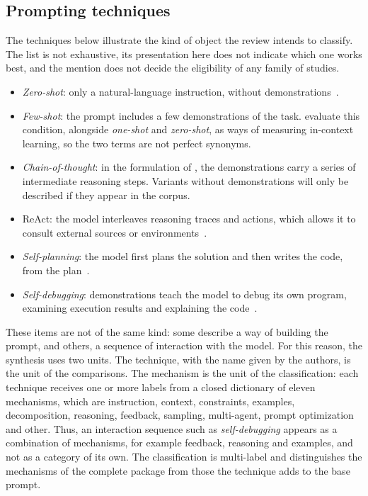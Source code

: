 \subsection{Prompting techniques}
The techniques below illustrate the kind of object the review intends to classify. The list is not
exhaustive, its presentation here does not indicate which one works best, and the mention does not decide the
eligibility of any family of studies.
\begin{itemize}
  \item \textit{Zero-shot}: only a natural-language instruction, without
  demonstrations~\citep{brown2020fewshot}.
  \item \textit{Few-shot}: the prompt includes a few demonstrations of the task.
  \citet{brown2020fewshot} evaluate this condition, alongside \textit{one-shot} and \textit{zero-shot},
  as ways of measuring in-context learning, so the two terms are not perfect synonyms.
  \item \textit{Chain-of-thought}: in the formulation of \citet{wei2022cot}, the demonstrations
  carry a series of intermediate reasoning steps. Variants without demonstrations will only be
  described if they appear in the corpus.
  \item ReAct: the model interleaves reasoning traces and actions, which allows it to consult external sources or
  environments~\citep{yao2023react}.
  \item \textit{Self-planning}: the model first plans the solution and then writes the code,
  from the plan~\citep{jiang2025selfplanningv5}.
  \item \textit{Self-debugging}: demonstrations teach the model to debug its own program,
  examining execution results and explaining the code~\citep{chen2023selfdebug}.
\end{itemize}
These items are not of the same kind: some describe a way of building the prompt, and others, a
sequence of interaction with the model.
For this reason, the synthesis uses two units. The technique, with the name given by the authors, is the unit of the comparisons.
The mechanism is the unit of the classification: each technique receives one or more labels from a closed dictionary of eleven
mechanisms, which are instruction, context, constraints, examples, decomposition, reasoning, feedback,
sampling, multi-agent, prompt optimization and other. Thus, an interaction sequence such as
\textit{self-debugging} appears as a combination of mechanisms, for example feedback, reasoning and
examples, and not as a category of its own. The classification is multi-label and distinguishes the mechanisms of the complete
package from those the technique adds to the base prompt.

